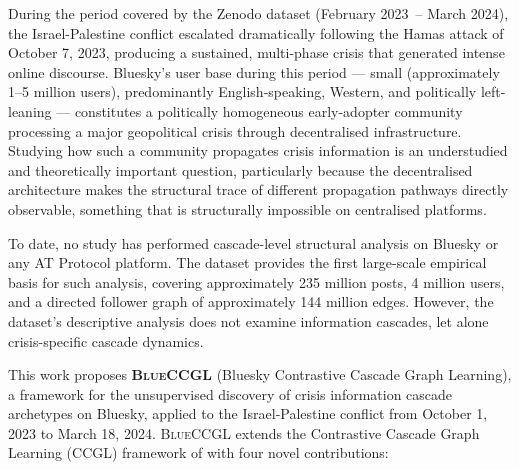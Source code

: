 \documentclass[12pt, a4paper]{article}
\newcommand{\BLUECCGL}{\textsc{BlueCCGL}\xspace}
\begin{document}
During the period covered by the \citet{failla2024bluesky} Zenodo dataset (February 2023~-- March 2024), the Israel-Palestine conflict escalated dramatically following the Hamas attack of October 7, 2023, producing a sustained, multi-phase crisis that generated intense online discourse. Bluesky's user base during this period --- small (approximately 1--5 million users), predominantly English-speaking, Western, and politically left-leaning --- constitutes a politically homogeneous early-adopter community processing a major geopolitical crisis through decentralised infrastructure. Studying how such a community propagates crisis information is an understudied and theoretically important question, particularly because the decentralised architecture makes the structural trace of different propagation pathways directly observable, something that is structurally impossible on centralised platforms.

To date, no study has performed cascade-level structural analysis on Bluesky or any AT Protocol platform. The \citet{failla2024bluesky} dataset provides the first large-scale empirical basis for such analysis, covering approximately 235 million posts, 4 million users, and a directed follower graph of approximately 144 million edges. However, the dataset's descriptive analysis does not examine information cascades, let alone crisis-specific cascade dynamics.

This work proposes \textbf{\BLUECCGL} (Bluesky Contrastive Cascade Graph Learning), a framework for the unsupervised discovery of crisis information cascade archetypes on Bluesky, applied to the Israel-Palestine conflict from October 1, 2023 to March 18, 2024. \BLUECCGL extends the Contrastive Cascade Graph Learning (CCGL) framework of \citet{xu2022ccgl} with four novel contributions:
\end{document}
